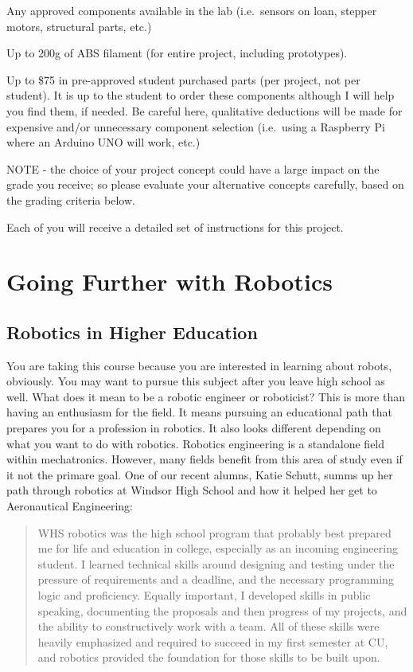 \documentclass[
]{book}
\begin{document}
Any approved components available in the lab (i.e.~sensors on loan, stepper motors, structural parts, etc.)

Up to 200g of ABS filament (for entire project, including prototypes).

Up to \$75 in pre-approved student purchased parts (per project, not per student). It is up to the student to order these components although I will help you find them, if needed. Be careful here, qualitative deductions will be made for expensive and/or unnecessary component selection (i.e.~using a Raspberry Pi where an Arduino UNO will work, etc.)

NOTE - the choice of your project concept could have a large impact on the grade you receive; so please evaluate your alternative concepts carefully, based on the grading criteria below.

Each of you will receive a detailed set of instructions for this project.

\hypertarget{going-further-with-robotics}{%
\chapter{Going Further with Robotics}\label{going-further-with-robotics}}

\hypertarget{robotics-in-higher-education}{%
\section{Robotics in Higher Education}\label{robotics-in-higher-education}}

You are taking this course because you are interested in learning about robots, obviously. You may want to pursue this subject after you leave high school as well. What does it mean to be a robotic engineer or roboticist? This is more than having an enthusiasm for the field. It means pursuing an educational path that prepares you for a profession in robotics. It also looks different depending on what you want to do with robotics. Robotics engineering is a standalone field within mechatronics. However, many fields benefit from this area of study even if it not the primare goal. One of our recent alumns, Katie Schutt, summs up her path through robotics at Windsor High School and how it helped her get to Aeronautical Engineering:

\begin{quote}
WHS robotics was the high school program that probably best prepared me for life and education in college, especially as an incoming engineering student. I learned technical skills around designing and testing under the pressure of requirements and a deadline, and the necessary programming logic and proficiency. Equally important, I developed skills in public speaking, documenting the proposals and then progress of my projects, and the ability to constructively work with a team. All of these skills were heavily emphasized and required to succeed in my first semester at CU, and robotics provided the foundation for those skills to be built upon.
\end{quote}
\end{document}
